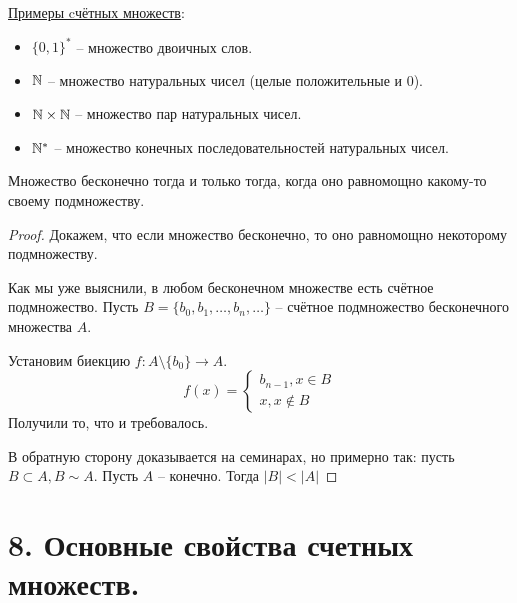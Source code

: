 \underline{Примеры cчётных множеств}:

\begin{itemize}
	\item $\{ 0, 1\}^*$ -- множество двоичных слов.
	\item $\mathbb{N}$ -- множество натуральных чисел (целые положительные и 0).
	\item $\mathbb{N} \times \mathbb{N}$ -- множество пар натуральных чисел.
	\item $\mathbb{N}^*$ -- множество конечных последовательностей натуральных чисел.
\end{itemize}

\statement Множество бесконечно тогда и только тогда, когда оно равномощно какому-то 
своему подмножеству.
\begin{proof}
	Докажем, что если множество бесконечно, то оно равномощно некоторому подмножеству.
	
	Как мы уже выяснили, в любом бесконечном множестве есть счётное подмножество.
	Пусть $B = \{b_0, b_1, \ldots, b_n, \ldots\}$ -- счётное подмножество
	бесконечного множества $A$.
	
	Установим биекцию $f: A \setminus \{b_0\} \to A$.
	\[
	f(x) = \begin{cases}
	b_{n-1}, x \in B \\
	x, x \notin B
	\end{cases}
	\]
	Получили то, что и требовалось.
	
	В обратную сторону доказывается на семинарах, но примерно так:
	пусть $B \subset A, B \sim A$. Пусть $A$ -- конечно. Тогда $|B| < |A|$
\end{proof}

\section*{8. Основные свойства счетных множеств.}

